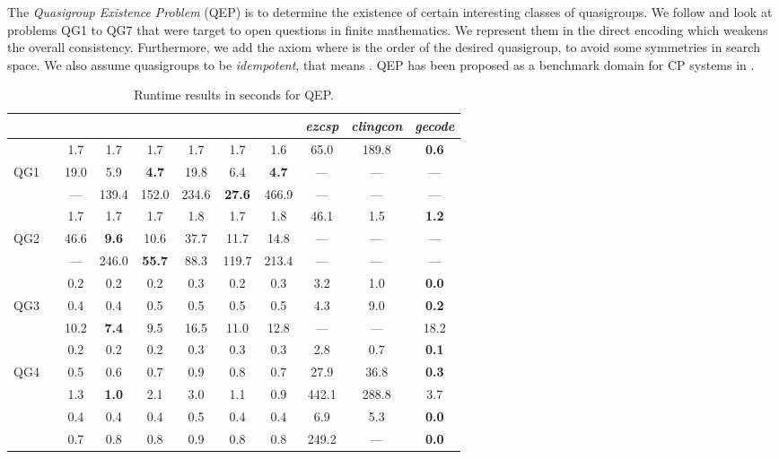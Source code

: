 \documentclass{tlp}
\newcommand{\systemname}[1]{\emph{#1}}
\newcommand{\encsup}{}
\newcommand{\encbou}{}
\newcommand{\encran}{}
\newcommand{\encbouh}[1]{\encbou}
\newcommand{\encranh}[1]{\encran}
\begin{document}
The \emph{Quasigroup Existence Problem} (QEP) is to determine the existence of certain interesting classes of quasigroups. We follow  and look at problems QG1 to QG7 that were target to open questions in finite mathematics.
We represent them in the direct encoding which weakens the overall consistency. Furthermore,
we add the axiom  where  is the order of the desired quasigroup, to avoid some symmetries in search space. We also assume quasigroups to be \emph{idempotent}, that means . QEP has been proposed as a benchmark domain for CP systems in .
\begin{table}
\caption{Runtime results in seconds for QEP.}
\label{tab:qep}
\begin{minipage}{\textwidth}
\begin{tabular}{ccccccccccc} \hline
 &  & \encsup & \encbouh{1} &\encbouh{3} & \encbou & \encranh{3} & \encran & \systemname{ezcsp} & \systemname{clingcon} & \systemname{gecode} \\ \hline\hline
&  & 1.7 & 1.7 & 1.7 & 1.7 & 1.7 & 1.6 & 65.0 & 189.8 & \textbf{0.6} \\
QG1 &  & 19.0& 5.9 &\textbf{4.7} &19.8 & 6.4 &\textbf{4.7} & --- & --- & --- \\
&  & --- & 139.4 &152.0& 234.6 & \textbf{27.6} &466.9 & --- & --- & --- \\ \noalign{\vspace {.2cm}}
&  & 1.7 & 1.7 &1.7 & 1.8 & 1.7 & 1.8 & 46.1 & 1.5 & \textbf{1.2} \\
QG2 &  & 46.6& \textbf{9.6} &10.6 &37.7 &11.7 &14.8 & --- & --- & --- \\
&  & --- & 246.0 &\textbf{55.7}& 88.3 &119.7 &213.4 & --- & --- & --- \\ \noalign{\vspace {.2cm}}
&  & 0.2 & 0.2 &0.2 & 0.3 & 0.2 & 0.3 & 3.2 & 1.0 & \textbf{0.0} \\
QG3 &  & 0.4 & 0.4 &0.5 & 0.5 & 0.5 & 0.5 & 4.3 & 9.0 & \textbf{0.2} \\
&  &10.2 &\textbf{7.4} &9.5 &16.5 &11.0 &12.8 & --- & --- & 18.2 \\ \noalign{\vspace {.2cm}}
&  & 0.2 & 0.2 &0.2 & 0.3 & 0.3 & 0.3 & 2.8 & 0.7 & \textbf{0.1} \\
QG4 &  & 0.5 & 0.6 &0.7 & 0.9 & 0.8 & 0.7 &27.9 &36.8 & \textbf{0.3} \\
&  & 1.3 & \textbf{1.0} &2.1 &3.0 &1.1 &0.9 &442.1&288.8& 3.7 \\ \noalign{\vspace {.2cm}}
&  & 0.4 & 0.4 &0.4 & 0.5 & 0.4 & 0.4 & 6.9 & 5.3 & \textbf{0.0} \\
&  & 0.7 & 0.8 &0.8 & 0.9 & 0.8 & 0.8 &249.2& --- & \textbf{0.0} \\

\end{tabular}
\end{minipage}
\end{table}
\end{document}
